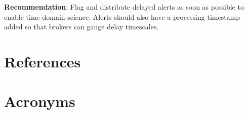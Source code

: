 \documentclass[DM,authoryear,toc]{lsstdoc}
\begin{document}
\textbf{Recommendation}: Flag and distribute delayed alerts as soon as possible to enable time-domain science.
Alerts should also have a processing timestamp added so that brokers can gauge delay timescales.

\appendix
\section{References} \label{sec:bib}
\renewcommand{\refname}{} %


\section{Acronyms} \label{sec:acronyms}

\end{document}
